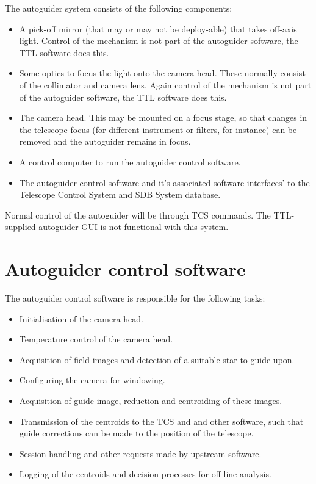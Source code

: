 \documentclass[10pt,a4paper]{article}
\begin{document}
The autoguider system consists of the following components:
\begin{itemize}
\item A pick-off mirror (that may or may not be deploy-able) that takes off-axis light. Control of the mechanism is not part of the autoguider software, the TTL software does this.
\item Some optics to focus the light onto the camera head. These normally consist of the collimator and camera lens.
Again control of the mechanism is not part of the autoguider software, the TTL software does this.
\item The camera head. This may be mounted on a focus stage, so that changes in the telescope focus (for different instrument or filters, for instance) can be removed and the autoguider remains in focus.
\item A control computer to run the autoguider control software.
\item The autoguider control software and it's associated software interfaces' to the Telescope Control System and SDB System database.
\end{itemize}

Normal control of the autoguider will be through TCS commands. The TTL-supplied autoguider GUI is not functional with this system.

\section{Autoguider control software}

The autoguider control software is responsible for the following tasks:
\begin{itemize}
\item Initialisation of the camera head.
\item Temperature control of the camera head.
\item Acquisition of field images and detection of a suitable star to guide upon.
\item Configuring the camera for windowing.
\item Acquisition of guide image, reduction and centroiding of these images.
\item Transmission of the centroids to the TCS and and other software, such that guide corrections can be
made to the position of the telescope.
\item Session handling and other requests made by upstream software.
\item Logging of the centroids and decision processes for off-line analysis.
\end{itemize}
\end{document}
